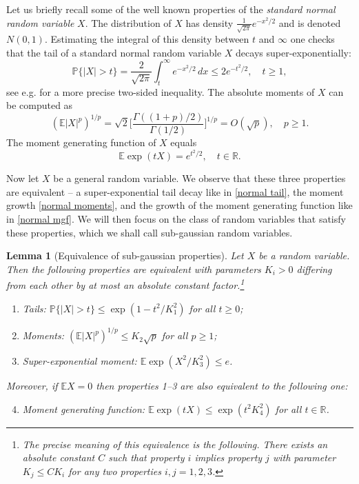 \documentclass[10pt, openany]{book}
\newtheorem{lemma}[theorem]{Lemma}
\theoremstyle{remark}
\def \R {\mathbb{R}}
\def \E {\mathbb{E}}
\def \P {\mathbb{P}}
\begin{document}
Let us briefly recall some of the well known properties of the {\em standard normal random variable} $X$.
The distribution of $X$ has density $\frac{1}{\sqrt{2 \pi}} e^{-x^2/2}$ and is denoted $N(0,1)$. 
Estimating the integral of this density between $t$ and $\infty$ one checks that 
the tail of a standard normal random variable $X$ decays super-exponentially:
\begin{equation}							\label{normal tail}
\P \{ |X| > t \} = \frac{2}{\sqrt{2 \pi}} \int_t^\infty e^{-x^2/2} \, dx
\le 2 e^{-t^2/2}, \quad t \ge 1,
\end{equation}
see e.g. \cite[Theorem 1.4]{Durrett} for a more precise two-sided inequality. 
The absolute moments of $X$ can be computed as
\begin{equation}							\label{normal moments}
(\E |X|^p)^{1/p} = \sqrt{2} \Big[ \frac{\Gamma((1+p)/2)}{\Gamma(1/2)} \Big]^{1/p}
= O(\sqrt{p}), \quad p \ge 1.
\end{equation}
The moment generating function of $X$ equals 
\begin{equation}							\label{normal mgf}
\E \exp(tX) = e^{t^2/2}, \quad t \in \R.
\end{equation}

Now let $X$ be a general random variable. We observe that these three properties are equivalent --
a super-exponential tail decay like in \eqref{normal tail}, the moment growth \eqref{normal moments},
and the growth of the moment generating function like in \eqref{normal mgf}. 
We will then focus on the class of random variables that satisfy these properties, which we shall call
sub-gaussian random variables. 

\begin{lemma}[Equivalence of sub-gaussian properties]			\label{sub-gaussian properties}
  Let $X$ be a random variable. Then the following properties are equivalent with parameters 
  $K_i > 0$ differing from each other by at most an absolute constant factor.\footnote{The precise meaning 
  of this equivalence is the following. There exists an absolute constant $C$ such that property $i$
  implies property $j$ with parameter $K_j \le C K_i$ for any two properties $i,j=1,2,3$.}
  
  \begin{enumerate}
    \item Tails:  
      $\P \{ |X| > t \} \le \exp(1-t^2/K_1^2)$ for all $t \ge 0$;
    \item Moments:
      $(\E |X|^p)^{1/p} \le K_2 \sqrt{p}$ for all $p \ge 1$;
    \item Super-exponential moment:
      $\E \exp(X^2/K_3^2) \le e$.
  \end{enumerate}
  Moreover, if $\E X = 0$ then properties 1--3 are also equivalent 
  to the following one: 
  \begin{enumerate} \setcounter{enumi}{3}
    \item Moment generating function:
      $\E \exp(tX) \le \exp(t^2 K_4^2)$ for all $t \in \R$.
  \end{enumerate}
  
\end{lemma}
\end{document}
